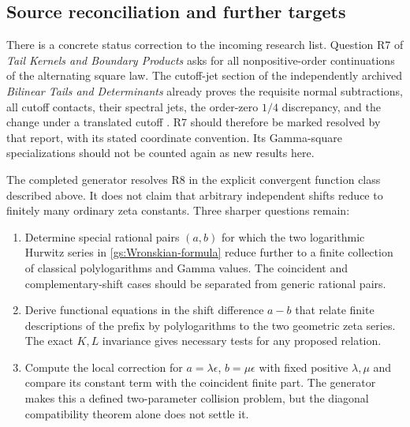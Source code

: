 \subsection{Source reconciliation and further targets}

There is a concrete status correction to the incoming research list.
Question R7 of \emph{Tail Kernels and Boundary Products} asks for all
nonpositive-order continuations of the alternating square law.
The cutoff-jet section of the independently archived
\emph{Bilinear Tails and Determinants} already proves the requisite
normal subtractions, all cutoff contacts, their spectral jets, the
order-zero $1/4$ discrepancy, and the change under a translated cutoff
\cite{RepoBilinear}.  R7 should therefore be marked resolved by
that report, with its stated coordinate convention.  Its Gamma-square
specializations should not be counted again as new results here.

The completed generator resolves R8 in the explicit convergent function
class described above.  It does not claim that arbitrary independent
shifts reduce to finitely many ordinary zeta constants.  Three sharper
questions remain:
\begin{enumerate}
\item Determine special rational pairs $(a,b)$ for which the two
logarithmic Hurwitz series in \eqref{gs:Wronskian-formula} reduce
further to a finite collection of classical polylogarithms and Gamma
values.  The coincident and complementary-shift cases should be
separated from generic rational pairs.
\item Derive functional equations in the shift difference $a-b$
that relate finite descriptions of the prefix by polylogarithms
to the two geometric zeta series.  The exact $K,L$ invariance gives
necessary tests for any proposed relation.
\item Compute the local correction for $a=\lambda\epsilon$,
$b=\mu\epsilon$ with fixed positive $\lambda,\mu$ and compare its
constant term with the coincident finite part.  The generator makes
this a defined two-parameter collision problem, but the diagonal
compatibility theorem alone does not settle it.
\end{enumerate}
